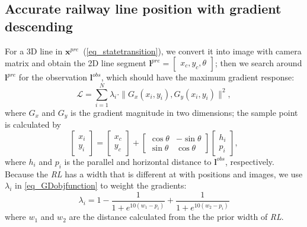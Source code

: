 \subsection{Accurate railway line position with gradient descending}
\label{sec_linereconstruction}
For a 3D line in $\mathbf{x}^{pre}$~(\cref{eq_statetransition}),
we convert it into image with camera matrix and obtain the 2D line segment
$\mathbf{l}^{pre}=\begin{bmatrix} x_c,y_c,\theta \end{bmatrix}$;
then we search around $\mathbf{l}^{pre}$ for the observation $\mathbf{l}^{obs}$,
which should have the maximum gradient response:
\begin{equation}
 \mathcal{L} = \sum_{i=1}^{N} \lambda_i \cdot \|G_x \left(x_i, y_i \right),G_y\left(x_i, y_i\right) \|^2, 
\label{eq_GDobjfunction}
\end{equation}
where $G_x$ and $G_y$ is the gradient magnitude in two dimensions;
the sample point is calculated by
\begin{equation}
\begin{bmatrix}
x_i \\
y_i
\end{bmatrix}
=
\begin{bmatrix}
x_c \\
y_c
\end{bmatrix}
+
\begin{bmatrix}
\cos\theta & -\sin\theta \\
\sin\theta & \cos\theta
\end{bmatrix}
\begin{bmatrix}
h_i \\
p_i
\end{bmatrix},
\label{eq_samplepoints}
\end{equation}
where $h_i$ and $ p_i$ is the parallel and horizontal distance to $\mathbf{l}^{obs}$,
respectively.
Because the \textit{RL} has a width that is different at with positions and images,
we use $\lambda_i$ in \cref{eq_GDobjfunction} to weight the gradients:
\begin{equation}
\lambda_i= 1 - \frac{1}{1 + e^{10\left(w_1-p_i \right)}} + \frac{1}{1 + e^{10\left(w_2-p_i\right)}}
\label{eq_gradientweight}
\end{equation}
where $w_1$ and $w_2$ are the distance calculated from the the prior width of \textit{RL}.

